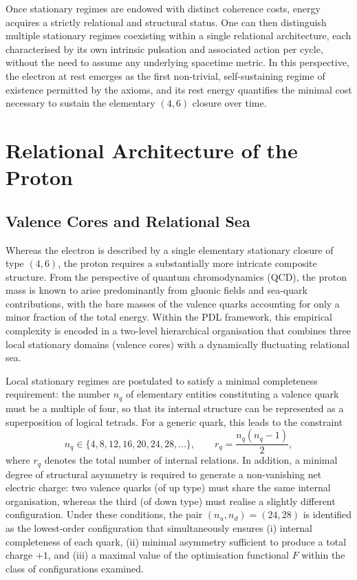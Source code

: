 \documentclass[12pt,a4paper]{article}
\begin{document}
Once stationary regimes are endowed with distinct coherence costs, energy acquires a strictly relational and structural status.
One can then distinguish multiple stationary regimes coexisting within a single relational architecture, each characterised by its own intrinsic pulsation and associated action per cycle, without the need to assume any underlying spacetime metric.
In this perspective, the electron at rest emerges as the first non-trivial, self-sustaining regime of existence permitted by the axioms, and its rest energy quantifies the minimal cost necessary to sustain the elementary \((4,6)\) closure over time.\cite{Laubscher2026PDL_English,Laubscher2026LDP_French}

\section{Relational Architecture of the Proton}

\subsection{Valence Cores and Relational Sea}

Whereas the electron is described by a single elementary stationary closure of type \((4,6)\), the proton requires a substantially more intricate composite structure. From the perspective of quantum chromodynamics (QCD), the proton mass is known to arise predominantly from gluonic fields and sea-quark contributions, with the bare masses of the valence quarks accounting for only a minor fraction of the total energy. Within the PDL framework, this empirical complexity is encoded in a two-level hierarchical organisation that combines three local stationary domains (valence cores) with a dynamically fluctuating relational sea.\cite{Laubscher2026PDL_English,Laubscher2026LDP_French}

Local stationary regimes are postulated to satisfy a minimal completeness requirement: the number \(n_q\) of elementary entities constituting a valence quark must be a multiple of four, so that its internal structure can be represented as a superposition of logical tetrads. For a generic quark, this leads to the constraint
\[
  n_q \in \{4,8,12,16,20,24,28,\dots\},
  \qquad
  r_q = \frac{n_q(n_q-1)}{2},
\]
where \(r_q\) denotes the total number of internal relations. In addition, a minimal degree of structural asymmetry is required to generate a non-vanishing net electric charge: two valence quarks (of up type) must share the same internal organisation, whereas the third (of down type) must realise a slightly different configuration. Under these conditions, the pair \((n_u,n_d) = (24,28)\) is identified as the lowest-order configuration that simultaneously ensures (i) internal completeness of each quark, (ii) minimal asymmetry sufficient to produce a total charge \(+1\), and (iii) a maximal value of the optimisation functional \(F\) within the class of configurations examined.\cite{Laubscher2026LDP_French,Laubscher2026PDL_English}
\end{document}
